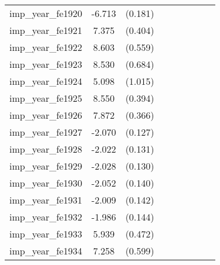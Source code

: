 {\begin{tabular}{l*{4}{cc}}
imp\_year\_fe1920&   -6.713\sym{***}&  (0.181)&                  &         &                  &         &                  &         \\
imp\_year\_fe1921&    7.375\sym{***}&  (0.404)&                  &         &                  &         &                  &         \\
imp\_year\_fe1922&    8.603\sym{***}&  (0.559)&                  &         &                  &         &                  &         \\
imp\_year\_fe1923&    8.530\sym{***}&  (0.684)&                  &         &                  &         &                  &         \\
imp\_year\_fe1924&    5.098\sym{***}&  (1.015)&                  &         &                  &         &                  &         \\
imp\_year\_fe1925&    8.550\sym{***}&  (0.394)&                  &         &                  &         &                  &         \\
imp\_year\_fe1926&    7.872\sym{***}&  (0.366)&                  &         &                  &         &                  &         \\
imp\_year\_fe1927&   -2.070\sym{***}&  (0.127)&                  &         &                  &         &                  &         \\
imp\_year\_fe1928&   -2.022\sym{***}&  (0.131)&                  &         &                  &         &                  &         \\
imp\_year\_fe1929&   -2.028\sym{***}&  (0.130)&                  &         &                  &         &                  &         \\
imp\_year\_fe1930&   -2.052\sym{***}&  (0.140)&                  &         &                  &         &                  &         \\
imp\_year\_fe1931&   -2.009\sym{***}&  (0.142)&                  &         &                  &         &                  &         \\
imp\_year\_fe1932&   -1.986\sym{***}&  (0.144)&                  &         &                  &         &                  &         \\
imp\_year\_fe1933&    5.939\sym{***}&  (0.472)&                  &         &                  &         &                  &         \\
imp\_year\_fe1934&    7.258\sym{***}&  (0.599)&                  &         &                  &         &                  &         \\

\end{tabular}}
